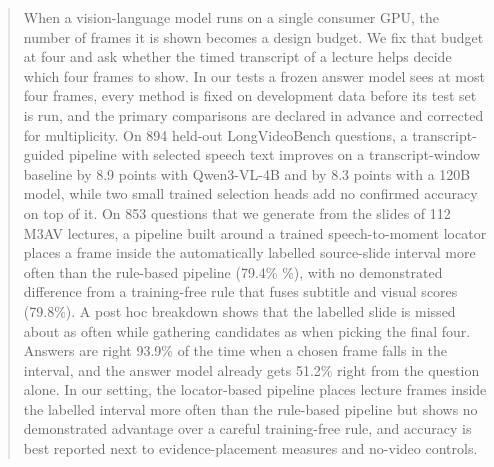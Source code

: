 \begin{abstract}
When a vision-language model runs on a single consumer GPU, the number of frames it is shown becomes a design budget.
We fix that budget at four and ask whether the timed transcript of a lecture helps decide which four frames to show.
In our tests a frozen answer model sees at most four frames, every method is fixed on development data before its test set is run, and the primary comparisons are declared in advance and corrected for multiplicity.
On 894 held-out LongVideoBench questions, a transcript-guided pipeline with selected speech text improves on a transcript-window baseline by 8.9 points with Qwen3-VL-4B and by 8.3 points with a 120B model, while two small trained selection heads add no confirmed accuracy on top of it.
On 853 questions that we generate from the slides of 112 M3AV lectures, a pipeline built around a trained speech-to-moment locator places a frame inside the automatically labelled source-slide interval more often than the rule-based pipeline (79.4\% \%), with no demonstrated difference from a training-free rule that fuses subtitle and visual scores (79.8\%).
A post hoc breakdown shows that the labelled slide is missed about as often while gathering candidates as when picking the final four.
Answers are right 93.9\% of the time when a chosen frame falls in the interval, and the answer model already gets 51.2\% right from the question alone.
In our setting, the locator-based pipeline places lecture frames inside the labelled interval more often than the rule-based pipeline but shows no demonstrated advantage over a careful training-free rule, and accuracy is best reported next to evidence-placement measures and no-video controls.
\end{abstract}
